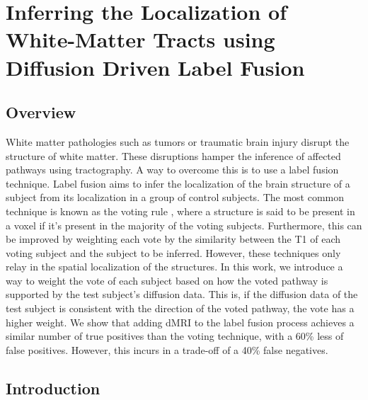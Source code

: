 \chapter{Inferring the Localization of White-Matter Tracts using Diffusion Driven Label Fusion}

\section{Overview}
White matter pathologies such as tumors or traumatic brain injury disrupt the
structure of white matter. These disruptions hamper the inference of affected
pathways using tractography. A way to overcome this is to use a label fusion
technique. Label fusion aims to infer the localization of the brain structure
of a subject from its localization in a group of control subjects. The most
common technique is known as the voting rule \cite{voting}, where a structure
is said to be present in a voxel if it's present in the majority of the voting
subjects. Furthermore, this can be improved by weighting each vote by the
similarity between the T1 of each voting subject and the subject to be inferred.
However, these techniques only relay in the spatial localization of the structures.
In this work, we introduce a way to weight the vote of each subject based on
how the voted pathway is supported by the test subject's diffusion data. This
is, if the diffusion data of the test subject is consistent with the direction
of the voted pathway, the vote has a higher weight. We show that adding dMRI to
the label fusion process achieves a similar number of true positives than the
voting technique, with a 60\% less of false positives. However, this incurs in
a trade-off of a 40\% false negatives.

\section{Introduction}

